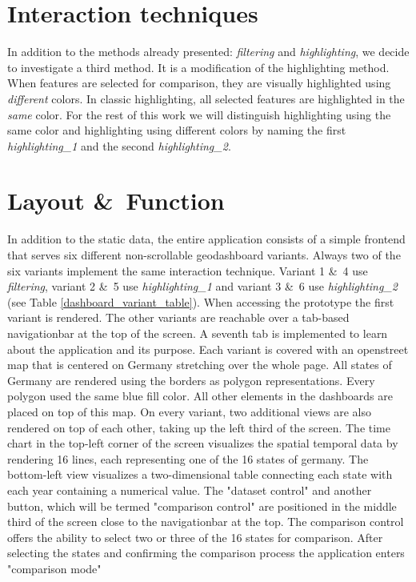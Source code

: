 \section{Interaction techniques}
In addition to the methods already presented: \textit{filtering} and \textit{highlighting}, we decide to investigate a third
method. It is a modification of the highlighting method. When features are selected for comparison, they are visually highlighted using
\textit{different} colors. In classic highlighting, all selected features are highlighted in the \textit{same} color. For the rest of
this work we will distinguish highlighting using the same color and highlighting using different colors by naming the first
\textit{highlighting\_1} and the second \textit{highlighting\_2}.

\section{Layout \&\ Function}
In addition to the static data, the entire application consists of a simple frontend that serves six different non-scrollable
geodashboard variants. Always two of the six variants implement the same interaction technique. Variant 1 \&\ 4 use
\textit{filtering}, variant 2 \&\ 5 use \textit{highlighting\_1} and variant 3 \&\ 6 use \textit{highlighting\_2}
(see Table \ref{dashboard_variant_table}). When accessing the prototype the first variant is rendered. The other variants are
reachable over a tab-based navigationbar at the top of the screen. A seventh tab is implemented to learn about the application
and its purpose. Each variant is covered with an openstreet map that is centered on Germany stretching over the whole page. All
states of Germany are rendered using the borders as polygon representations. Every polygon used the same
blue fill color. All other elements in the dashboards are placed on top of this map. On every variant, two additional views
are also rendered on top of each other, taking up the left third of the screen. The time chart in the top-left corner of the
screen visualizes the spatial temporal data by rendering 16 lines, each representing one of the 16 states of germany. The
bottom-left view visualizes a two-dimensional table connecting each state with each year containing a numerical value. The
"dataset control" and another button, which will be termed "comparison control" are positioned in the middle third of the
screen close to the navigationbar at the top. The comparison control offers the ability to select two or three of the 16
states for comparison. After selecting the states and confirming the comparison process the application enters "comparison mode" 
